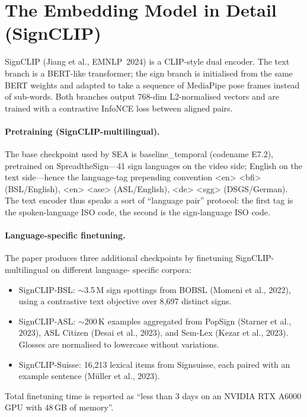 \documentclass[11pt,a4paper]{article}
\def\texttt#1{#1}%
\def\emph#1{#1}%
\begin{document}
\section{The Embedding Model in Detail (SignCLIP)}
\label{sec:paper-emb}

SignCLIP (Jiang et al., EMNLP~2024) is a CLIP-style dual encoder. The text
branch is a BERT-like transformer; the sign branch is initialised from the
same BERT weights and adapted to take a sequence of MediaPipe pose frames
instead of sub-words. Both branches output 768-dim L2-normalised vectors and
are trained with a contrastive InfoNCE loss between aligned pairs.

\paragraph{Pretraining (\emph{SignCLIP-multilingual}).} The base checkpoint
used by SEA is \texttt{baseline\_temporal} (codename \texttt{E7.2}), pretrained
on SpreadtheSign---41 sign languages on the video side; English on the text
side---hence the language-tag prepending convention
\texttt{<en> <bfi>} (BSL/English), \texttt{<en> <ase>} (ASL/English),
\texttt{<de> <sgg>} (DSGS/German). The text encoder thus speaks a sort of
``language pair'' protocol: the first tag is the spoken-language ISO code,
the second is the sign-language ISO code.

\paragraph{Language-specific finetuning.} The paper produces three additional
checkpoints by finetuning \emph{SignCLIP-multilingual} on different language-
specific corpora:
\begin{itemize}[leftmargin=1.5em]
  \item \emph{SignCLIP-BSL}: $\sim$3.5\,M sign spottings from BOBSL
        (Momeni et al., 2022), using a contrastive text objective over
        8{,}697 distinct signs.
  \item \emph{SignCLIP-ASL}: $\sim$200\,K examples aggregated from PopSign
        (Starner et al., 2023), ASL Citizen (Desai et al., 2023), and
        Sem-Lex (Kezar et al., 2023). Glosses are normalised to lowercase
        without variations.
  \item \emph{SignCLIP-Suisse}: 16{,}213 lexical items from Signsuisse, each
        paired with an example sentence (M{\"u}ller et al., 2023).
\end{itemize}
Total finetuning time is reported as ``less than 3 days on an NVIDIA RTX
A6000 GPU with 48\,GB of memory''.
\end{document}
